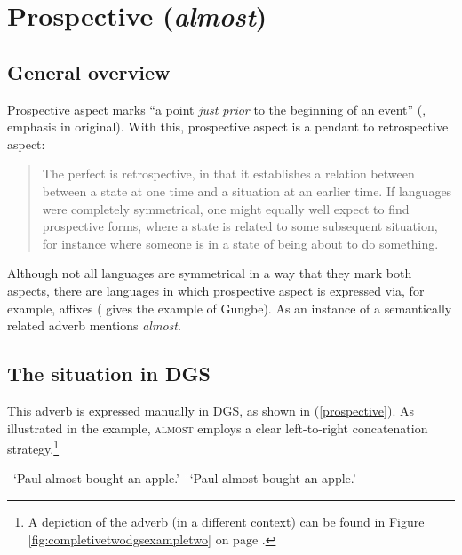 
\section{Prospective (\textit{almost})}
\subsection{General overview}
Prospective aspect marks ``a point \textit{just prior} to the beginning of an event'' (\citealt[332]{frawley1992linguistic}, emphasis in original). With this, prospective aspect is a pendant to retrospective aspect:

\begin{quote}
The perfect is retrospective, in that it establishes a relation between between a state at one time and a situation at an earlier time. If languages were completely symmetrical, one might equally well expect to find prospective forms, where a state is related to some subsequent situation, for instance where someone is in a state of being about to do something. \citep[64]{comrie1976aspect}
\end{quote}

\noindent Although not all languages are symmetrical in a way that they mark both aspects, there are languages in which prospective aspect is expressed via, for example, affixes (\citealt[99]{cinque1999adverbs} gives the example of Gungbe). As an instance of a semantically related adverb \citet[99]{cinque1999adverbs} mentions \textit{almost}.

\subsection{The situation in DGS}
This adverb is expressed manually in DGS, as shown in (\ref{prospective}). As illustrated in the example, \textsc{almost} employs a clear left-to-right concatenation strategy.\footnote{ A depiction of the adverb (in a different context) can be found in Figure \ref{fig:completivetwodgsexampletwo} on page \pageref{fig:completivetwodgsexampletwo}.}

\begin{exe}
\ex\label{prospective}\begin{xlist} 
\glt \textcolor{white}{*}`Paul almost bought an apple.' \label{ex:retrospectivea}
\glt \textcolor{white}{*}`Paul almost bought an apple.' \label{ex:retrospectivea}
\end{xlist}
\end{exe} 

